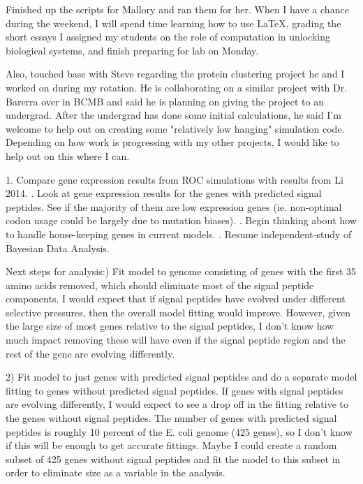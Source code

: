 \documentclass[11pt]{labbook}
\begin{document}
Finished up the scripts for Mallory and ran them for her. When I have a chance during the weekend, I will spend time learning how to use LaTeX, grading the short essays I assigned my students on the role of computation in unlocking biological systems, and finish preparing for lab on Monday.
\newline

Also, touched base with Steve regarding the protein clustering project he and I worked on during my rotation. He is collaborating on a similar project with Dr. Barerra over in BCMB and said he is planning on giving the project to an undergrad. After the undergrad has done some initial calculations, he said I'm welcome to help out on creating some "relatively low hanging" simulation code. Depending on how work is progressing with my other projects, I would like to help out on this where I can. 

1. Compare gene expression results from ROC simulations with results from Li 2014.
. Look at gene expression results for the genes with predicted signal peptides. See if the majority of them are low expression genes (ie. non-optimal codon usage could be largely due to mutation biases).
. Begin thinking about how to handle house-keeping genes in current models.
. Resume independent-study of Bayesian Data Analysis.


Next steps for analysis:) Fit model to genome consisting of genes with the first 35 amino acids removed, which should eliminate most of the signal peptide components. I would expect that if signal peptides have evolved under different selective pressures, then the overall model fitting would improve. However, given the large size of most genes relative to the signal peptides, I don't know how much impact removing these will have even if the signal peptide region and the rest of the gene are evolving differently. 

2) Fit model to just genes with predicted signal peptides and do a separate model fitting to genes without predicted signal peptides. If genes with signal peptides are evolving differently, I would expect to see a drop off in the fitting relative to the genes without signal peptides. The number of genes with predicted signal peptides is roughly 10 percent of the E. coli genome (425 genes), so I don't know if this will be enough to get accurate fittings. Maybe I could create a random subset of 425 genes without signal peptides and fit the model to this subset in order to eliminate size as a variable in the analysis.
\end{document}
